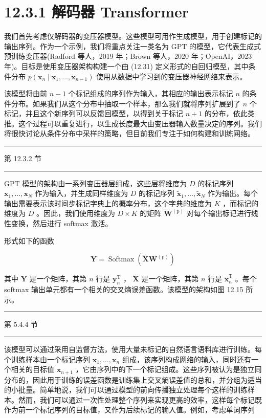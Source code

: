\documentclass[10pt]{report}
\newcommand{\HRule}{\begin{center}\rule{0.9\linewidth}{0.2mm}\end{center}}
\begin{document}
\section*{12.3.1 解码器 Transformer}

我们首先考虑仅解码器的变压器模型。这些模型可用作生成模型，用于创建标记的输出序列。作为一个示例，我们将重点关注一类名为 GPT 的模型，它代表生成式预训练变压器(Radford 等人，2019 年；Brown 等人，2020 年；OpenAI，2023 年)。目标是使用变压器架构构建一个由 (12.31) 定义形式的自回归模型，其中条件分布 \(p\left( {{\mathbf{x}}_{n} \mid  {\mathbf{x}}_{1},\ldots ,{\mathbf{x}}_{n - 1}}\right)\) 使用从数据中学习到的变压器神经网络来表示。

该模型将由前 \(n - 1\) 个标记组成的序列作为输入，其相应的输出表示标记 \(n\) 的条件分布。如果我们从这个分布中抽取一个样本，那么我们就将序列扩展到了 \(n\) 个标记，并且这个新序列可以反馈回模型，以得到关于标记 \(n + 1\) 的分布，依此类推。这个过程可以重复进行，以生成长度最大由变压器输入数量决定的序列。我们将很快讨论从条件分布中采样的策略，但目前我们专注于如何构建和训练网络。

\HRule

第 12.3.2 节

\HRule

GPT 模型的架构由一系列变压器层组成，这些层将维度为 \(D\) 的标记序列 \({\mathbf{x}}_{1},\ldots ,{\mathbf{x}}_{N}\) 作为输入，并生成同样维度为 \(D\) 的标记序列 \({\widetilde{\mathbf{x}}}_{1},\ldots ,{\widetilde{\mathbf{x}}}_{N}\) 作为输出。每个输出需要表示该时间步标记字典上的概率分布，这个字典的维度为 \(K\) ，而标记的维度为 \(D\) 。因此，我们使用维度为 \(D \times  K\) 的矩阵 \({\mathbf{W}}^{\left( \mathrm{p}\right) }\) 对每个输出标记进行线性变换，然后进行 softmax 激活。

形式如下的函数

\[
\mathbf{Y} = \operatorname{Softmax}\left( {\widetilde{\mathbf{X}}{\mathbf{W}}^{\left( \mathrm{p}\right) }}\right)  \tag{12.33}
\]

其中 \(\mathbf{Y}\) 是一个矩阵，其第 \(n\) 行是 \({\mathbf{y}}_{n}^{\mathrm{T}}\) ， \(\widetilde{\mathbf{X}}\) 是一个矩阵，其第 \(n\) 行是 \({\widetilde{\mathbf{x}}}_{n}^{\mathrm{T}}\) 。每个 softmax 输出单元都有一个相关的交叉熵误差函数。该模型的架构如图 12.15 所示。

\HRule

第 5.4.4 节

\HRule

该模型可以通过采用自监督方法，使用大量未标记的自然语言语料库进行训练。每个训练样本由一个标记序列 \({\mathbf{x}}_{1},\ldots ,{\mathbf{x}}_{n}\) 组成，该序列构成网络的输入，同时还有一个相关的目标值 \({\mathbf{x}}_{n + 1}\) ，它由序列中的下一个标记组成。这些序列被认为是独立同分布的，因此用于训练的误差函数是训练集上交叉熵误差值的总和，并分组为适当的小批量。简单地说，我们可以通过模型的前向传播独立处理每个这样的训练样本。然而，我们可以通过一次性处理整个序列来实现更高的效率，这样每个标记既作为前一个标记序列的目标值，又作为后续标记的输入值。例如，考虑单词序列
\end{document}
